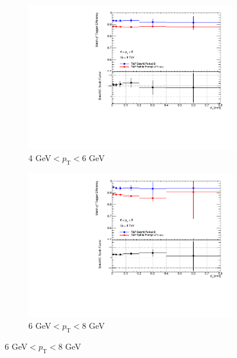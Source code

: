 \begin{figure}[tbhp]
  \centering
  \begin{subfigure}[b]{0.55\textwidth}
    \includegraphics[width=\textwidth]{PartCalibration2012/Plots/SFPlots/ptCourse_4_6__smt.pdf}
    \caption{4 GeV$<p_{\textrm{T}}<$6 GeV} \label{fig:CalibrationD04to6}
  \end{subfigure}
  
  \begin{subfigure}[b]{0.55\textwidth}
    \includegraphics[width=\textwidth]{PartCalibration2012/Plots/SFPlots/ptCourse_6_8__smt.pdf}
    \caption{6 GeV$<p_{\textrm{T}}<$8 GeV} \label{fig:CalibrationD06to8}
  \end{subfigure}


\end{figure}
